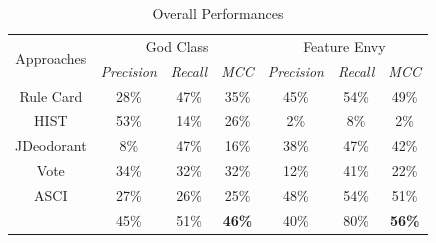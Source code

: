 \begin{table}
\caption{Overall Performances}
\label{Table: overall performances}
\begin{adjustbox}{width=\linewidth}
\begin{tabular}{|c|c|c|c|c|c|c|}
\hline
\multirow{2}{*}{Approaches}& 
\multicolumn{3}{c|}{
	God Class
} 
&\multicolumn{3}{c|}{
	Feature Envy
}\bigstrut [t] \\ 
\cline{2-7}
&\textit{Precision}&\textit{Recall}&\textit{  MCC  }
&\textit{Precision}&\textit{Recall}&\textit{  MCC  }
\bigstrut [t]\\
\hline
Rule Card &28\%&47\%&35\%&45\%&54\%&49\% \bigstrut \\ \hline
HIST &53\%&14\%&26\%&2\%&8\%&2\% \bigstrut \\ \hline
JDeodorant &8\%&47\%&16\%&38\%&47\%&42\% \bigstrut \\ \hline
Vote &34\%&32\%&32\%&12\%&41\%&22\% \bigstrut \\ \hline
ASCI &27\%&26\%&25\%&48\%&54\%&51\% \bigstrut \\ \hline
\textbf{\NAME{}} &45\%&51\%&\textbf{46\%}&40\%&80\%&\textbf{56\%} \bigstrut \\ \hline
\end{tabular}
\end{adjustbox}
\end{table}

